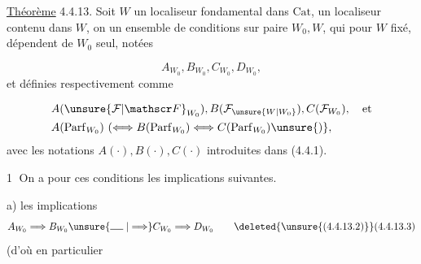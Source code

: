 \uline{Théorème} 4.4.13. Soit $W$ un localiseur fondamental dans $\mathrm{Cat}$,  un localiseur  contenu dans $W$, on  un ensemble de  conditions sur  paire $W_0,W$, qui pour $W$ fixé, dépendent de $W_0$ seul, notées

\[
 A_{W_0}, B_{W_0}, C_{W_0}, D_{W_0},\tag*{(4.4.13.1)}
\]
et définies  respectivement comme

\[
\begin{aligned}
 &A(\unsure{\mathcal F|\mathscr F}_{W_0}),B(\mathcal F_{\unsure{W|W_0}}),C(\mathcal F_{W_0}),\quad\text{et}\\
 &A(\mathrm{Parf}_{W_0})\ (\Longleftrightarrow B(\mathrm{Parf}_{W_0})\Longleftrightarrow C(\mathrm{Parf}_{W_0})\unsure{)}, 
\end{aligned}
\]
avec les notations $A(\cdot),B(\cdot),C(\cdot)$ introduites dans (4.4.1).  
\inserted{\[
 A,\ B,\ C,\ D \tag*{(4.4.13.2)}
\]}

\textcircled{1} On a pour ces conditions les  implications suivantes.

a)  les implications 
\deleted{\[
 A_{\unsure{W_0|W'_0}}\Longrightarrow A_{W'_0},\ B_{W_0}\unsure{\Rightarrow|=}
\]}
\[
 A_{W_0}\Longrightarrow B_{W_0}\unsure{\mathrel{\rule{1.3em}{.5pt}}|\Longrightarrow} C_{W_0}\Longrightarrow D_{W_0}
 \tag*{\deleted{\unsure{(4.4.13.2)}}(4.4.13.3)}
\]
(d'où en particulier

